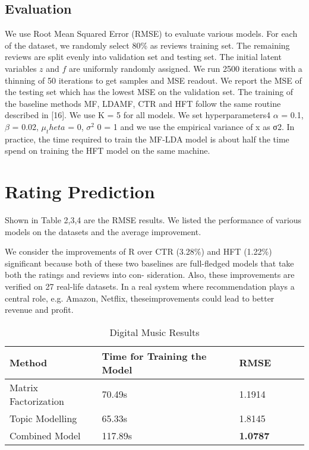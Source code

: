 \documentclass[10pt,conference]{IEEEtran}
\begin{document}
\subsection{Evaluation}
We use Root Mean Squared Error (RMSE) to evaluate various models.
For each of the dataset, we randomly select 80\% as reviews training set. The remaining reviews are split evenly into validation set and testing set. The initial latent variables $z$ and $f$ are uniformly randomly assigned. We run 2500 iterations with a thinning of 50 iterations to get samples and MSE readout. We report the MSE of the testing set which has the lowest MSE on the validation set. The training of the baseline methods MF, LDAMF, CTR and HFT follow the same routine described in [16]. We use K = 5 for all models. We set hyperparameters4 $\alpha$ = 0.1, $\beta$ = 0.02, $\mu_theta$ = 0, $\sigma^2$ 0 = 1 and we use the empirical variance of x as σ2. In practice, the time required to train the MF-LDA model is about half the time spend on training the HFT model on the same machine.

\section{Rating Prediction}

Shown in Table 2,3,4 are the RMSE results. We listed the performance of various models on the datasets and the average improvement.

We consider the improvements of R over CTR (3.28\%) and HFT (1.22\%) significant because both of these​ two baselines are full-fledged models that take both the ratings and reviews into con- sideration. Also, these improvements are verified on 27 r​eal-life datasets. In a real system where recommendation plays a central ro​le, e.g. Amazon, Netflix, these ​improvements could le​ad to better revenue and profit.	


\begin{table}[h]
\centering
\caption{Digital Music Results}
\label{Digital Music Results}
\begin{tabular}{ llllll }
\toprule
\textbf{Method} & \textbf{Time for Training the Model} & \textbf{RMSE} \\
\midrule
Matrix Factorization & 70.49s & 1.1914 \\
\hline
Topic Modelling & 65.33s & 1.8145 \\
\hline
Combined Model & 117.89s  & \textbf{1.0787} \\ 
\bottomrule
\end{tabular}
\end{table}
\end{document}
